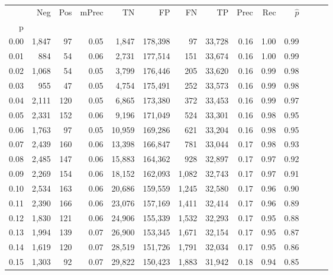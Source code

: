 \begin{tabular}{rrrrrrrrrrrrrr}
\toprule
{} &    Neg &  Pos & mPrec &       TN &       FP &      FN &      TP &  Prec &   Rec & $\hat{p}$ \\
p    &        &      &       &          &          &         &         &       &       &           \\
\midrule
0.00 &  1,847 &   97 &  0.05 &    1,847 &  178,398 &      97 &  33,728 &  0.16 &  1.00 &      0.99 \\
0.01 &    884 &   54 &  0.06 &    2,731 &  177,514 &     151 &  33,674 &  0.16 &  1.00 &      0.99 \\
0.02 &  1,068 &   54 &  0.05 &    3,799 &  176,446 &     205 &  33,620 &  0.16 &  0.99 &      0.98 \\
0.03 &    955 &   47 &  0.05 &    4,754 &  175,491 &     252 &  33,573 &  0.16 &  0.99 &      0.98 \\
0.04 &  2,111 &  120 &  0.05 &    6,865 &  173,380 &     372 &  33,453 &  0.16 &  0.99 &      0.97 \\
0.05 &  2,331 &  152 &  0.06 &    9,196 &  171,049 &     524 &  33,301 &  0.16 &  0.98 &      0.95 \\
0.06 &  1,763 &   97 &  0.05 &   10,959 &  169,286 &     621 &  33,204 &  0.16 &  0.98 &      0.95 \\
0.07 &  2,439 &  160 &  0.06 &   13,398 &  166,847 &     781 &  33,044 &  0.17 &  0.98 &      0.93 \\
0.08 &  2,485 &  147 &  0.06 &   15,883 &  164,362 &     928 &  32,897 &  0.17 &  0.97 &      0.92 \\
0.09 &  2,269 &  154 &  0.06 &   18,152 &  162,093 &   1,082 &  32,743 &  0.17 &  0.97 &      0.91 \\
0.10 &  2,534 &  163 &  0.06 &   20,686 &  159,559 &   1,245 &  32,580 &  0.17 &  0.96 &      0.90 \\
0.11 &  2,390 &  166 &  0.06 &   23,076 &  157,169 &   1,411 &  32,414 &  0.17 &  0.96 &      0.89 \\
0.12 &  1,830 &  121 &  0.06 &   24,906 &  155,339 &   1,532 &  32,293 &  0.17 &  0.95 &      0.88 \\
0.13 &  1,994 &  139 &  0.07 &   26,900 &  153,345 &   1,671 &  32,154 &  0.17 &  0.95 &      0.87 \\
0.14 &  1,619 &  120 &  0.07 &   28,519 &  151,726 &   1,791 &  32,034 &  0.17 &  0.95 &      0.86 \\
0.15 &  1,303 &   92 &  0.07 &   29,822 &  150,423 &   1,883 &  31,942 &  0.18 &  0.94 &      0.85 \\

\end{tabular}
